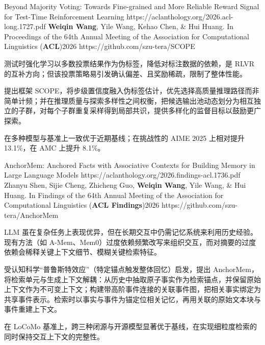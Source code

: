 \pub
  {Beyond Majority Voting: Towards Fine-grained and More Reliable Reward Signal for Test-Time Reinforcement Learning}
  {https://aclanthology.org/2026.acl-long.1727.pdf}
  {\textbf{Weiqin Wang}, Yile Wang, Kehao Chen, \& Hui Huang.}
  {In Proceedings of the 64th Annual Meeting of the Association for Computational Linguistics (\textbf{ACL})}{2026}
  {https://github.com/szu-tera/SCOPE}
\begin{pubnotes}
  \item {}测试时强化学习以多数投票结果作为伪标签，降低对标注数据的依赖，是 RLVR 的互补方向；但该投票策略易引发确认偏差、且奖励稀疏，限制了整体性能。
  \item {}提出框架 SCOPE，将步级置信度融入伪标签估计，优先选择高质量推理路径而非简单计频；并在推理质量与探索多样性之间权衡，把候选输出池动态划分为相互独立的子群，对每个子群重复采样得到局部共识，提供多样化的监督目标以鼓励更广探索。
  \item {}在多种模型与基准上一致优于近期基线；在挑战性的 AIME 2025 上相对提升 13.1\%，在 AMC 上提升 8.1\%。
\end{pubnotes}

\pub
  {AnchorMem: Anchored Facts with Associative Contexts for Building Memory in Large Language Models}
  {https://aclanthology.org/2026.findings-acl.1736.pdf}
  {Zhanyu Shen, Sijie Cheng, Zhicheng Guo, \textbf{Weiqin Wang}, Yile Wang, \& Hui Huang.}
  {In Findings of the 64th Annual Meeting of the Association for Computational Linguistics (\textbf{ACL Findings})}{2026}
  {https://github.com/szu-tera/AnchorMem}
\begin{pubnotes}
  \item {}LLM 虽在复杂任务上表现优异，但在长期交互中仍需记忆系统来利用历史经验。现有方法（如 A-Mem、Mem0）过度依赖频繁改写来组织交互，而对摘要的过度依赖会稀释关键上下文细节、模糊关键检索特征。
  \item {}受认知科学“普鲁斯特效应”（特定锚点触发整体回忆）启发，提出 AnchorMem，将检索单元与生成上下文解耦：从历史中抽取原子事实作为检索锚点，并保留原始上下文作为不可变上下文；构建带高阶事件连接的关联事件图，把相关事实绑定为共享事件表示。检索时以事实与事件为锚定位相关记忆，再用关联的原始文本块与事件重建上下文。
  \item {}在 LoCoMo 基准上，跨三种闭源与开源模型显著优于基线，在实现细粒度检索的同时保持交互上下文的完整性。
\end{pubnotes}

